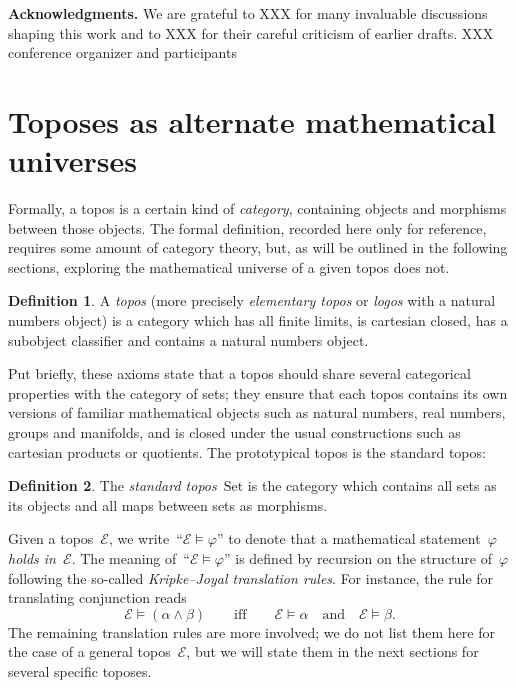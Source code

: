 \documentclass[oneside,reqno]{amsart}
\theoremstyle{definition}
\newtheorem{defn}{Definition}[section]
\theoremstyle{plain}
\theoremstyle{remark}
\newcommand{\E}{\mathcal{E}}
\newcommand{\Set}{\mathrm{Set}}
\renewcommand{\_}{\mathpunct{.}\,}
\newcommand{\?}{\,{:}\,}
\renewcommand{\paragraph}[1]{\noindent\textbf{#1.}}
\begin{document}
\paragraph{Acknowledgments} We are grateful to XXX for many invaluable
discussions shaping this work and to XXX for their careful criticism of earlier
drafts. XXX conference organizer and participants


\section{Toposes as alternate mathematical universes}

Formally, a topos is a certain kind of \emph{category}, containing objects and
morphisms between those objects. The formal definition, recorded here only for
reference, requires some amount of category theory, but, as will be outlined in
the following sections, exploring the mathematical universe of a given topos
does not.

\begin{defn}A \emph{topos} (more precisely \emph{elementary topos} or
\emph{logos} with a natural numbers object) is a category which has all finite
limits, is cartesian closed, has a subobject classifier and contains a natural
numbers object.\end{defn}

Put briefly, these axioms state that a topos should share several categorical
properties with the category of sets; they ensure that each topos contains its
own versions of familiar mathematical objects such as natural numbers, real
numbers, groups and manifolds, and is closed under the usual constructions
such as cartesian products or quotients.
The prototypical topos is the standard topos:

\begin{defn}The \emph{standard topos}~$\Set$ is the category which contains all
sets as its objects and all maps between sets as morphisms.\end{defn}

Given a topos~$\E$, we write~``$\E \models \varphi$'' to denote that a
mathematical statement~$\varphi$ \emph{holds in~$\E$}. The meaning of~``$\E \models
\varphi$'' is defined by recursion on the structure of~$\varphi$ following the
so-called \emph{Kripke--Joyal translation rules}. For instance, the rule for
translating conjunction reads
\[ \E \models (\alpha \wedge \beta) \qquad\text{iff}\qquad
  \E \models \alpha \quad\text{and}\quad \E \models \beta. \]
The remaining translation rules are more involved; we do not list them here for
the case of a general topos~$\E$, but we will state them in the next sections
for several specific toposes.
\end{document}
